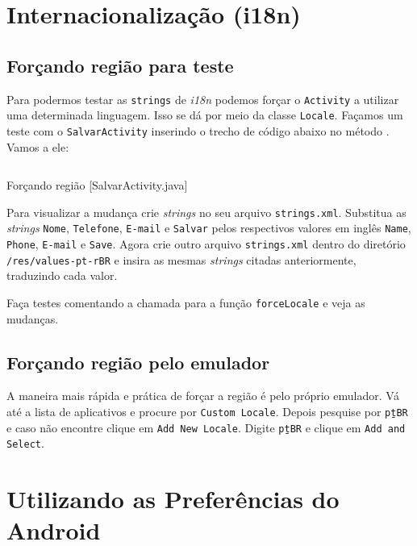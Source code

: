 \section{Internacionalização (i18n)}

\subsection{Forçando região para teste}

Para podermos testar as \texttt{strings} de \textit{i18n} podemos forçar o \texttt{Activity}
a utilizar uma determinada linguagem. Isso se dá por meio da classe \texttt{Locale}.
Façamos um teste com o \texttt{SalvarActivity} inserindo o trecho de código abaixo no
método . Vamos a ele:

\begin{listing}[H]
  \inputminted[linenos=true,frame=bottomline,tabsize=3]{ java }{ source/SalvarActivity-5.java }
  \caption{Forçando região [SalvarActivity.java]}
\end{listing}

Para visualizar a mudança crie \textit{strings} no seu arquivo \texttt{strings.xml}. Substitua
as \textit{strings} \texttt{Nome}, \texttt{Telefone}, \texttt{E-mail} e \texttt{Salvar} pelos
respectivos valores em inglês \texttt{Name}, \texttt{Phone}, \texttt{E-mail} e \texttt{Save}.
Agora crie outro arquivo \texttt{strings.xml} dentro do diretório \texttt{/res/values-pt-rBR} e
insira as mesmas \textit{strings} citadas anteriormente, traduzindo cada valor.

Faça testes comentando a chamada para a função \texttt{forceLocale} e veja as mudanças.

\subsection{Forçando região pelo emulador}

A maneira mais rápida e prática de forçar a região é pelo próprio emulador. Vá até a lista de
aplicativos e procure por \texttt{Custom Locale}. Depois pesquise por \texttt{pt\b{ }BR} e caso não encontre
clique em \texttt{Add New Locale}. Digite \texttt{pt\b{ }BR} e clique em \texttt{Add and Select}.

\section{Utilizando as Preferências do Android}

